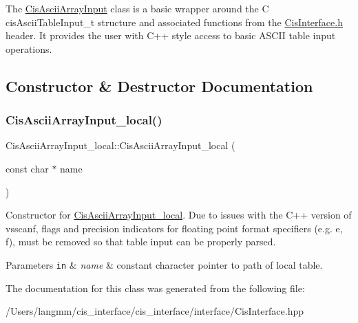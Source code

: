 The \mbox{\hyperlink{classCisAsciiArrayInput}{Cis\+Ascii\+Array\+Input}} class is a basic wrapper around the C cis\+Ascii\+Table\+Input\+\_\+t structure and associated functions from the \mbox{\hyperlink{CisInterface_8h_source}{Cis\+Interface.\+h}} header. It provides the user with C++ style access to basic A\+S\+C\+II table input operations. 

\subsection{Constructor \& Destructor Documentation}
\mbox{\label{classCisAsciiArrayInput__local_ab1a315749639f0edd562184bcdb34d42}} 
\subsubsection{\texorpdfstring{Cis\+Ascii\+Array\+Input\+\_\+local()}{CisAsciiArrayInput\_local()}}
{\footnotesize\ttfamily Cis\+Ascii\+Array\+Input\+\_\+local\+::\+Cis\+Ascii\+Array\+Input\+\_\+local (\begin{DoxyParamCaption}\item[{const char $\ast$}]{name }\end{DoxyParamCaption})\hspace{0.3cm}{\ttfamily [inline]}}



Constructor for \mbox{\hyperlink{classCisAsciiArrayInput__local}{Cis\+Ascii\+Array\+Input\+\_\+local}}. Due to issues with the C++ version of vsscanf, flags and precision indicators for floating point format specifiers (e.\+g. e, f), must be removed so that table input can be properly parsed. 


\begin{DoxyParams}[1]{Parameters}
\mbox{\tt in}  & {\em name} & constant character pointer to path of local table. \\
\hline
\end{DoxyParams}


The documentation for this class was generated from the following file\+:\begin{DoxyCompactItemize}
\item 
/\+Users/langmm/cis\+\_\+interface/cis\+\_\+interface/interface/Cis\+Interface.\+hpp\end{DoxyCompactItemize}
